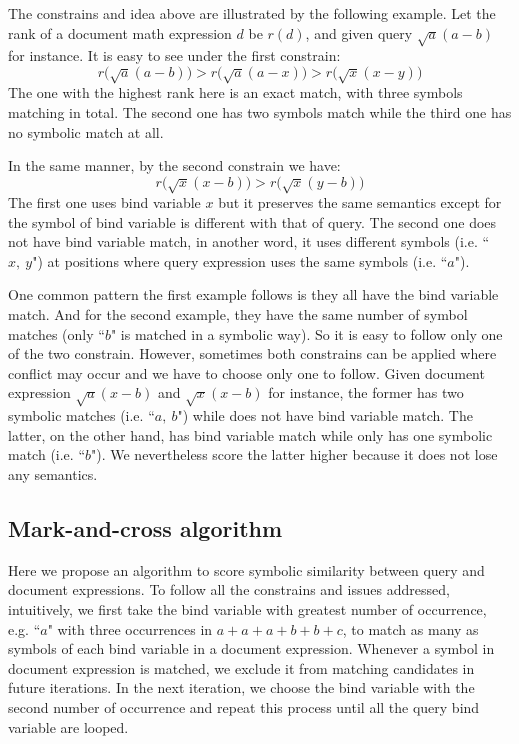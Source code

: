 The constrains and idea above are illustrated by the following example. 
Let the rank of a document math expression $d$ be $r(d)$, and given query $\sqrt a (a - b)$ for instance. 
It is easy to see under the first constrain: 
$$
r\big(\sqrt a (a - b)\big) > r\big(\sqrt a (a - x)\big) > r\big(\sqrt x (x - y)\big)
$$
The one with the highest rank here is an exact match, with three symbols matching in total. 
The second one has two symbols match while the third one has no symbolic match at all. 

In the same manner, by the second constrain we have:
$$
r\big(\sqrt x (x - b)\big) > r\big(\sqrt x (y - b)\big)
$$
The first one uses bind variable $x$ but it preserves the same semantics except for the symbol of bind variable is different with that of query.
The second one does not have bind variable match, in another word, it uses different symbols (i.e. ``$x,\ y$") at positions where query expression uses the same symbols (i.e. ``$a$").

One common pattern the first example follows is they all have the bind variable match. 
And for the second example, they have the same number of symbol matches (only ``$b$" is matched in a symbolic way). 
So it is easy to follow only one of the two constrain. 
However, sometimes both constrains can be applied where conflict may occur and we have to choose only one to follow. 
Given document expression $\sqrt a (x - b)$ and $\sqrt x (x - b)$ for instance, the former has two symbolic matches (i.e. ``$a,\ b$") while does not have bind variable match. The latter, on the other hand, has bind variable match while only has one symbolic match (i.e. ``$b$"). We nevertheless score the latter higher because it does not lose any semantics. 

\subsection{Mark-and-cross algorithm}
Here we propose an algorithm to score symbolic similarity between query and document expressions.
To follow all the constrains and issues addressed, intuitively, we first take the bind variable with greatest number of occurrence, e.g. ``$a$" with three occurrences in $a+a+a+b+b+c$, to match as many as symbols of each bind variable in a document expression. 
Whenever a symbol in document expression is matched, we exclude it from matching candidates in future iterations.
In the next iteration, we choose the bind variable with the second number of occurrence and repeat this process until all the query bind variable are looped.

